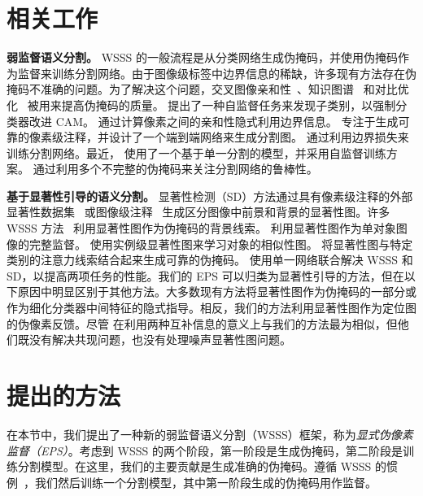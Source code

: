 \documentclass[final]{cvpr}
\begin{document}
\section{相关工作}

\noindent\textbf{弱监督语义分割。}
WSSS 的一般流程是从分类网络生成伪掩码，并使用伪掩码作为监督来训练分割网络。由于图像级标签中边界信息的稀缺，许多现有方法存在伪掩码不准确的问题。为了解决这个问题，交叉图像亲和性~\cite{fan2020cian}、知识图谱~\cite{liu2020leveraging} 和对比优化~\cite{sun2020mining, zhang2020splitting} 被用来提高伪掩码的质量。\cite{chang2020weakly} 提出了一种自监督任务来发现子类别，以强制分类器改进 CAM。\cite{ahn2019weakly, ahn2018learning} 通过计算像素之间的亲和性隐式利用边界信息。\cite{zhang2020reliability} 专注于生成可靠的像素级注释，并设计了一个端到端网络来生成分割图。\cite{huang2018weakly, kolesnikov2016seed} 通过利用边界损失来训练分割网络。最近，\cite{araslanov2020single} 使用了一个基于单一分割的模型，并采用自监督训练方案。\cite{fan2020employing} 通过利用多个不完整的伪掩码来关注分割网络的鲁棒性。



\vspace{1mm}
\noindent\textbf{基于显著性引导的语义分割。}
显著性检测（SD）方法通过具有像素级注释的外部显著性数据集~\cite{hou2017deeply, xiao2018deep, zhao2019pyramid} 或图像级注释~\cite{wang2017learning} 生成区分图像中前景和背景的显著性图。许多 WSSS 方法~\cite{fan2020cian, huang2018weakly, lee2019ficklenet, li2018tell, wei2017object, wei2018revisiting} 利用显著性图作为伪掩码的背景线索。\cite{wei2016stc} 利用显著性图作为单对象图像的完整监督。\cite{fan2018associating} 使用实例级显著性图来学习对象的相似性图。\cite{chaudhry_dcsp_2017, wang2018weakly, yao2020saliency} 将显著性图与特定类别的注意力线索结合起来生成可靠的伪掩码。\cite{zeng2019joint} 使用单一网络联合解决 WSSS 和 SD，以提高两项任务的性能。我们的 EPS 可以归类为显著性引导的方法，但在以下原因中明显区别于其他方法。大多数现有方法将显著性图作为伪掩码的一部分或作为细化分类器中间特征的隐式指导。相反，我们的方法利用显著性图作为定位图的伪像素反馈。尽管\cite{zeng2019joint} 在利用两种互补信息的意义上与我们的方法最为相似，但他们既没有解决共现问题，也没有处理噪声显著性图问题。


\section{提出的方法}

在本节中，我们提出了一种新的弱监督语义分割（WSSS）框架，称为\emph{显式伪像素监督（EPS）}。考虑到 WSSS 的两个阶段，第一阶段是生成伪掩码，第二阶段是训练分割模型。在这里，我们的主要贡献是生成准确的伪掩码。遵循 WSSS 的惯例~\cite{fan2020learning,jiang2019integral,lee2019ficklenet,li2018tell,wang2020self,wei2017object}，我们然后训练一个分割模型，其中第一阶段生成的伪掩码用作监督。
\end{document}
